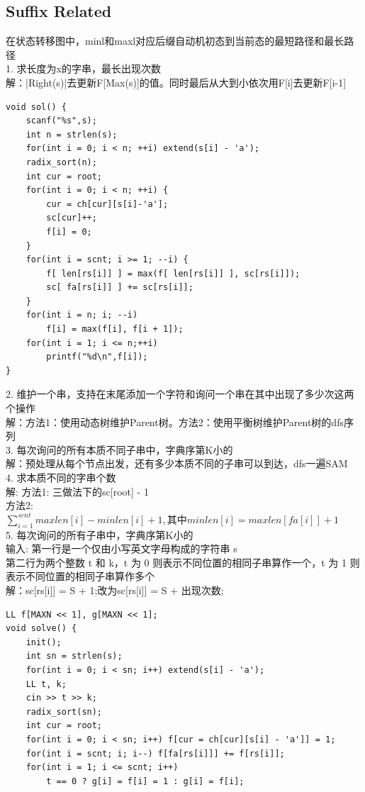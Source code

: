 \documentclass[10pt]{ctexart}
\begin{document}
{\subsection{Suffix Related}
在状态转移图中，minl和maxl对应后缀自动机初态到当前态的最短路径和最长路径\\
1. 求长度为x的字串，最长出现次数\\
解：|Right(s)|去更新F[Max(s)]的值。同时最后从大到小依次用F[i]去更新F[i-1]\\
\begin{lstlisting}
void sol() {
	scanf("%s",s);
	int n = strlen(s);
	for(int i = 0; i < n; ++i) extend(s[i] - 'a');
	radix_sort(n);
	int cur = root;
	for(int i = 0; i < n; ++i) {
		cur = ch[cur][s[i]-'a'];
		sc[cur]++;
		f[i] = 0;
	}
	for(int i = scnt; i >= 1; --i) {
		f[ len[rs[i]] ] = max(f[ len[rs[i]] ], sc[rs[i]]);
		sc[ fa[rs[i]] ] += sc[rs[i]];
	}
	for(int i = n; i; --i)
		f[i] = max(f[i], f[i + 1]);
	for(int i = 1; i <= n;++i)
		printf("%d\n",f[i]);
}
\end{lstlisting}
2. 维护一个串，支持在末尾添加一个字符和询问一个串在其中出现了多少次这两个操作\\
解：方法1：使用动态树维护Parent树。方法2：使用平衡树维护Parent树的dfs序列\\
3. 每次询问的所有本质不同子串中，字典序第K小的\\
解：预处理从每个节点出发，还有多少本质不同的子串可以到达，dfs一遍SAM\\
4. 求本质不同的字串个数\\
解: 方法1: 三做法下的sc[root] - 1 \\
方法2: $ \sum_{i=1}^{scnt}{maxlen[i]−minlen[i]+1} , 其中 minlen[i]=maxlen[fa[i]]+1 $\\
5. 每次询问的所有子串中，字典序第K小的\\
输入: 第一行是一个仅由小写英文字母构成的字符串 s\\
第二行为两个整数 t 和 k，t 为 0 则表示不同位置的相同子串算作一个，t 为 1 则表示不同位置的相同子串算作多个\\
解：sc[rs[i]] = S + 1;改为sc[rs[i]] = S + 出现次数;\\
\begin{lstlisting}
LL f[MAXN << 1], g[MAXN << 1];
void solve() {
	init();
	int sn = strlen(s);
	for(int i = 0; i < sn; i++) extend(s[i] - 'a');
	LL t, k;
	cin >> t >> k;
	radix_sort(sn);
	int cur = root;
	for(int i = 0; i < sn; i++) f[cur = ch[cur][s[i] - 'a']] = 1;
	for(int i = scnt; i; i--) f[fa[rs[i]]] += f[rs[i]];
	for(int i = 1; i <= scnt; i++) 
		t == 0 ? g[i] = f[i] = 1 : g[i] = f[i];

\end{lstlisting}}
\end{document}
